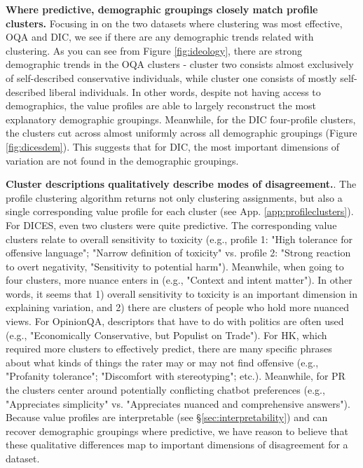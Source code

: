 \documentclass[11pt]{article}
\begin{document}
\textbf{Where predictive, demographic groupings closely match profile clusters.}
Focusing in on the two datasets where clustering was most effective, OQA and DIC, we see if there are any demographic trends related with clustering. As you can see from Figure \ref{fig:ideology}, there are strong demographic trends in the OQA clusters - cluster two consists almost exclusively of self-described conservative individuals, while cluster one consists of mostly self-described liberal individuals. In other words, despite not having access to demographics, the value profiles are able to largely reconstruct the most explanatory demographic groupings. Meanwhile, for the DIC four-profile clusters, the clusters cut across almost uniformly across all demographic groupings (Figure \ref{fig:dicesdem}). This suggests that for DIC, the most important dimensions of variation are not found in the demographic groupings.

\textbf{Cluster descriptions qualitatively describe modes of disagreement.}.
The profile clustering algorithm returns not only clustering assignments, but also a single corresponding value profile for each cluster (see App. \ref{app:profileclusters}).
For DICES, even two clusters were quite predictive. The corresponding value clusters relate to overall sensitivity to toxicity (e.g., profile 1: "High tolerance for offensive language"; "Narrow definition of toxicity" vs. profile 2: "Strong reaction to overt negativity, "Sensitivity to potential harm"). Meanwhile, when going to four clusters, more nuance enters in (e.g., "Context and intent matter"). In other words, it seems that 1) overall sensitivity to toxicity is an important dimension in explaining variation, and 2) there are clusters of people who hold more nuanced views.
For OpinionQA, descriptors that have to do with politics are often used (e.g., "Economically Conservative, but Populist on Trade"). For HK, which required more clusters to effectively predict, there are many specific phrases about what kinds of things the rater may or may not find offensive (e.g., "Profanity tolerance"; "Discomfort with stereotyping"; etc.). Meanwhile, for PR the clusters center around potentially conflicting chatbot preferences (e.g., "Appreciates simplicity" vs. "Appreciates nuanced and comprehensive answers").
Because value profiles are interpretable (see \S \ref{sec:interpretability}) and can recover demographic groupings where predictive, we have reason to believe that these qualitative differences map to important dimensions of disagreement for a dataset.
\end{document}
